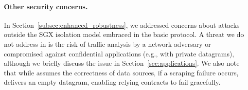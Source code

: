 \vspace{-1ex}
\paragraph{Other security concerns.} In Section~\ref{subsec:enhanced_robustness}, we addressed concerns about attacks outside the SGX isolation model embraced in the basic \tc protocol. A threat we do not address in \tc is the risk of traffic analysis by a network adversary or compromised \medname against confidential applications (e.g., with private datagrams), although we briefly discuss the issue in Section~\ref{sec:applications}. We also note that while \tc assumes the correctness of data sources, if a scraping failure occurs, \tc delivers an empty datagram, enabling relying contracts to fail gracefully.

